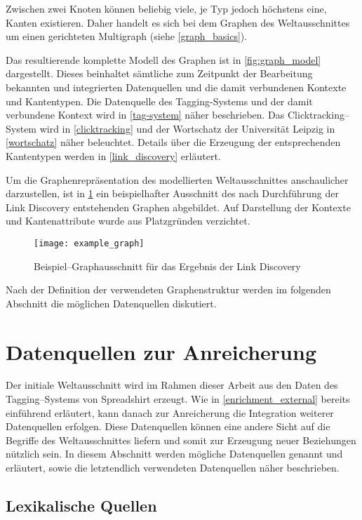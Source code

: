 Zwischen zwei Knoten können beliebig viele, je Typ jedoch höchstens eine, Kanten existieren. Daher handelt es sich bei dem Graphen des Weltausschnittes um einen gerichteten Multigraph (siehe \cref{graph_basics}).

Das resultierende komplette Modell des Graphen ist in \cref{fig:graph_model} dargestellt. Dieses beinhaltet sämtliche zum Zeitpunkt der Bearbeitung bekannten und integrierten Datenquellen und die damit verbundenen Kontexte und Kantentypen. Die Datenquelle des Tagging-Systems und der damit verbundene Kontext wird in \cref{tag-system} näher beschrieben. Das Clicktracking--System wird in \cref{clicktracking} und der Wortschatz der Universität Leipzig in \cref{wortschatz} näher beleuchtet. Details über die Erzeugung der entsprechenden Kantentypen werden in \cref{link_discovery} erläutert.

Um die Graphenrepräsentation des modellierten Weltausschnittes anschaulicher darzustellen, ist in \cref{fig:example_graph} ein beispielhafter Ausschnitt des nach Durchführung der Link Discovery entstehenden Graphen abgebildet. Auf Darstellung der Kontexte und Kantenattribute wurde aus Platzgründen verzichtet.

\begin{figure}
\centering
\texttt{[image: example\_graph]}
\caption{Beispiel--Graphausschnitt für das Ergebnis der Link Discovery}
\label{fig:example_graph}
\end{figure}

Nach der Definition der verwendeten Graphenstruktur werden im folgenden Abschnitt die möglichen Datenquellen diskutiert.

\section{Datenquellen zur Anreicherung}

Der initiale Weltausschnitt wird im Rahmen dieser Arbeit aus den Daten des Tagging--Systems von Spreadshirt erzeugt. Wie in \cref{enrichment_external} bereits einführend erläutert, kann danach zur Anreicherung die Integration weiterer Datenquellen erfolgen. Diese Datenquellen können eine andere Sicht auf die Begriffe des Weltausschnittes liefern und somit zur Erzeugung neuer Beziehungen nützlich sein. In diesem Abschnitt werden mögliche Datenquellen genannt und erläutert, sowie die letztendlich verwendeten Datenquellen näher beschrieben.

\subsection{Lexikalische Quellen}

